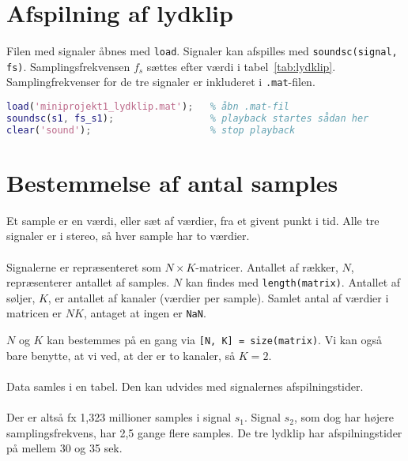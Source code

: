 \documentclass[a4paper]{report}
\begin{document}
\section{Afspilning af lydklip}

        \begin{par}

Filen med signaler åbnes med \texttt{load}.
Signaler kan afspilles med \texttt{soundsc(signal, fs)}.
Samplingsfrekvensen $f_s$ sættes efter værdi i tabel~\ref{tab:lydklip}.
Samplingfrekvenser for de tre signaler er inkluderet i
\texttt{.mat}-filen.

\end{par} 

\begin{lstlisting}[language=Matlab, style=Matlab-editor]
load('miniprojekt1_lydklip.mat');   % åbn .mat-fil
soundsc(s1, fs_s1);                 % playback startes sådan her
clear('sound');                     % stop playback
\end{lstlisting}



\section{Bestemmelse af antal samples}

        \begin{par}

Et sample er en værdi, eller sæt af værdier, fra et givent punkt i tid.
Alle tre signaler er i stereo, så hver sample har to værdier.\\\\
Signalerne er repræsenteret som $N\times K$-matricer.
Antallet af rækker, $N$, repræsenterer antallet af samples.
$N$ kan findes med \texttt{length(matrix)}.
Antallet af søljer, $K$, er antallet af kanaler (værdier per sample).
Samlet antal af værdier i matricen er $NK$, antaget at ingen er \texttt{NaN}.\\

\end{par} 
\begin{par}

$N$ og $K$ kan bestemmes på en gang via \texttt{[N, K] = size(matrix)}.
Vi kan også bare benytte, at vi ved, at der er to kanaler, så $K = 2$. \\\\
Data samles i en tabel. Den kan udvides med signalernes afspilningstider.\\\\
Der er altså fx 1,323 millioner samples i signal $s_1$.
Signal $s_2$, som dog har højere samplingsfrekvens, har 2,5 gange flere
samples.
De tre lydklip har afspilningstider på mellem 30 og 35 sek.\\

\end{par} 
\end{document}
